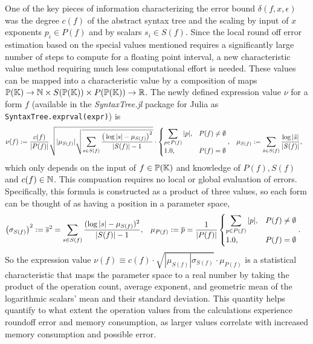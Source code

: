 \documentclass[]{elsarticle}
\begin{document}
One of the key pieces of information characterizing the error bound $\delta(f,x,\epsilon)$ was the degree $c(f)$ of the abstract syntax tree and the scaling by input of $x$ exponents $p_i\in P(f)$ and by scalars $s_i\in S(f)$.
Since the local round off error estimation based on the special values mentioned requires a significantly large number of steps to compute for a floating point interval, a new characteristic value method requiring much less computational effort is needed.
These values can be mapped into a characteristic value by a composition of maps $\mathbb{P}(\mathbb{K})\rightarrow \mathbb{N}\times S(\mathbb{P}(\mathbb{K}))\times P(\mathbb{P}(\mathbb{K})) \rightarrow \mathbb{R}$.
The newly defined expression value $\nu$ for a form $f$ (available in the \textit{SyntaxTree.jl} \cite{chakravala-syntax-tree} package for Julia as \verb+SyntaxTree.exprval(expr)+) is
\begin{align*}
	\nu(f) &:= \frac{c(f)}{|P(f)|}\sqrt{|\mu_{S(f)}|\sqrt{\sum_{s\in S(f)}\frac{\big(\log|s|-\mu_{S(f)}\big)^2}{|S(f)|-1}}} \cdot \begin{cases} \displaystyle\sum_{p\in P(f)} |p|, & P(f) \neq\emptyset \\ 1.0, & P(f) = \emptyset \end{cases}, &
	\mu_{S(f)} &:= \sum_{\hat s\in S(f)} \frac{\log |\hat s|}{|S(f)|},
\end{align*}
which only depends on the input of $f\in\mathbb{P}(\mathbb{K})$ and knowledge of $P(f),S(f)$ and $c(f)\in\mathbb{N}$. This compuation requires no local or global evaluation of errors.
Specifically, this formula is constructed as a product of three values, so each form can be thought of as having a position in a parameter space,
\begin{align*}
	\left(\sigma_{S(f)}\right)^2 &:= \overline{s}^2 = \sum_{s\in S(f)}\frac{(\log|s|-\mu_{S(f)})^2}{|S(f)|-1}, & \mu_{P(f)} &:= \overline{p} = \frac1{|P(f)|}\begin{cases} \displaystyle\sum_{p\in P(f)}|p|, & P(f)\neq\emptyset \\ 1.0, & P(f)=\emptyset \end{cases}.
\end{align*}
So the expression value $\nu(f) \equiv c(f)\cdot \sqrt{|\mu_{S(f)}|\sigma_{S(f)}}\cdot \mu_{P(f)}$ is a statistical characteristic that maps the parameter space to a real number by taking the product of the operation count, average exponent, and geometric mean of the logarithmic scalars' mean and their standard deviation.
This quantity helps quantify to what extent the operation values from the calculations experience roundoff error and memory consumption, as larger values correlate with increased memory consumption and possible error.
\end{document}
